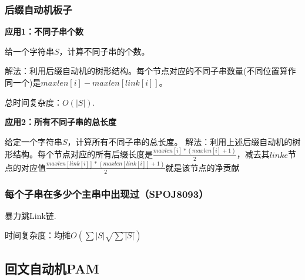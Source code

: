 \documentclass{article}
\begin{document}
\subsubsection{后缀自动机板子}
\textbf{应用1：不同子串个数}\par
给一个字符串$S$，计算不同子串的个数。\par
解法：利用后缀自动机的树形结构。每个节点对应的不同子串数量(不同位置算作同一个)是$maxlen[i]-maxlen[link[i]]$。\par
总时间复杂度：$O(|S|)$.\par
\textbf{应用2：所有不同子串的总长度}\par
给定一个字符串$S$，计算所有不同子串的总长度。
解法：利用上述后缀自动机的树形结构。每个节点对应的所有后缀长度是$\frac{maxlen[i]\ast (maxlen[i]+1)}{2}$，减去其$linke$节点的对应值$\frac{maxlen[link[i]]\ast (maxlen[link[i]]+1)}{2}$就是该节点的净贡献

\subsubsection{每个子串在多少个主串中出现过（SPOJ8093）}
暴力跳Link链.\par
时间复杂度：$均摊O(\sum |S|\sqrt{\sum |S|})$



\subsection{回文自动机PAM}
\end{document}
